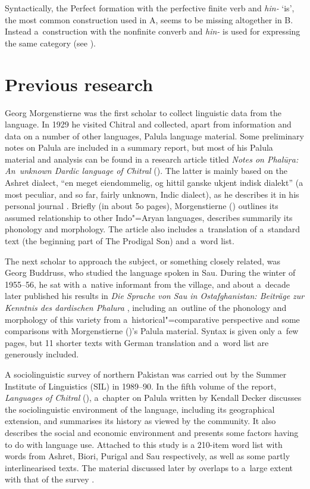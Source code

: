 Syntactically, the Perfect formation with the perfective finite verb and \textit{hin-} `is', the most common construction used in A, seems to be missing altogether in B. Instead a~construction with the nonfinite converb and \textit{hin-} is used for expressing the same category (see ).


\section{Previous research}
\label{sec:1-5}

Georg Morgenstierne was the first scholar to collect linguistic data from the language. In 1929 he visited Chitral and
collected, apart from information and data on a number of other languages, Palula language material. Some preliminary notes on Palula are included in a summary report, but most of his Palula material and analysis can be found in a research article titled \textit{Notes on Phal\=uṛa: An~unknown Dardic language of Chitral}
(\citeyear{morgenstierne1941}). The latter is mainly based on the Ashret dialect, ``en meget eiendommelig, og hittil ganske ukjent indisk dialekt'' (a most peculiar, and so far, fairly unknown, Indic dialect), as he describes it in his personal journal \citep[38]{morgenstiernelorentzen1992}. Briefly (in about 5o pages),
Morgenstierne (\citeyear{morgenstierne1941}) outlines its assumed relationship to other Indo"=Aryan languages, describes summarily its
phonology and morphology. The article also includes a~translation of a~standard text (the beginning part of The Prodigal Son) and
a~word list.


The next scholar to approach the subject, or something closely related, was Georg
Buddruss, who studied the language spoken in Sau. During the winter of 1955--56, he sat with a~native
informant from the village, and about a~decade later published his results in \textit{Die Sprache
  von Sau in Ostafghanistan: Beiträge zur Kenntnis des dardischen Phalura} \citep{buddruss1967},
including an~outline of the phonology and morphology of this variety from a~historical"=comparative
perspective and some comparisons with Morgenstierne (\citeyear{morgenstierne1941})'s Palula material. Syntax is given only a~few
pages, but 11 shorter texts with German translation and a~word list are generously included.


A sociolinguistic survey of northern Pakistan was carried out by the Summer Institute of Linguistics
(SIL) in 1989--90. In the fifth volume of the report, \textit{Languages of Chitral}
(\citealt{decker1992a}), a~chapter on Palula written by Kendall Decker discusses the
sociolinguistic environment of the language, including its geographical extension, and summarises
its history as viewed by the community. It also describes the social and economic environment and
presents some factors having to do with language use. Attached to this study is a 210-item word list
with words from Ashret, Biori, Purigal and Sau respectively, as well as some partly interlinearised
texts. The material discussed later by \citet{decker1992b,decker1996} overlaps to a~large
extent with that of the survey \citep{decker1992a}.


